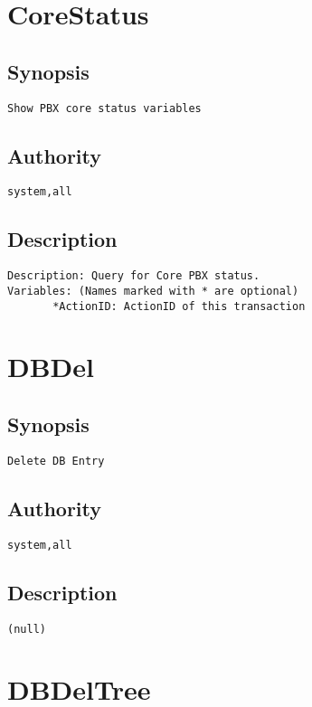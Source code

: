 \section{CoreStatus}
\subsection{Synopsis}
\begin{verbatim}
Show PBX core status variables
\end{verbatim}
\subsection{Authority}
\begin{verbatim}
system,all
\end{verbatim}
\subsection{Description}
\begin{verbatim}
Description: Query for Core PBX status.
Variables: (Names marked with * are optional)
       *ActionID: ActionID of this transaction

\end{verbatim}


\section{DBDel}
\subsection{Synopsis}
\begin{verbatim}
Delete DB Entry
\end{verbatim}
\subsection{Authority}
\begin{verbatim}
system,all
\end{verbatim}
\subsection{Description}
\begin{verbatim}
(null)
\end{verbatim}


\section{DBDelTree}
